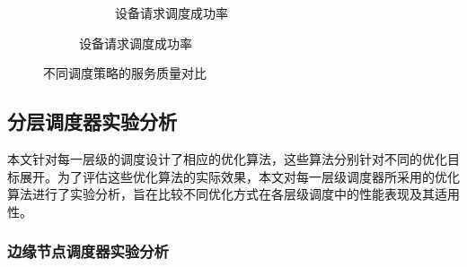 \begin{figure}[ht]
\begin{subfigure}{\textwidth}
\begin{subfigure}{0.48\textwidth}
            \caption{设备请求调度成功率}
            \vspace{0.3cm}
        \end{subfigure}
    \end{subfigure}
    \caption{不同调度策略的服务质量对比}
    \label{fig:exp1}
\end{figure}

\subsection{分层调度器实验分析}

本文针对每一层级的调度设计了相应的优化算法，这些算法分别针对不同的优化目标展开。为了评估这些优化算法的实际效果，本文对每一层级调度器所采用的优化算法进行了实验分析，旨在比较不同优化方式在各层级调度中的性能表现及其适用性。

\subsubsection{边缘节点调度器实验分析}

